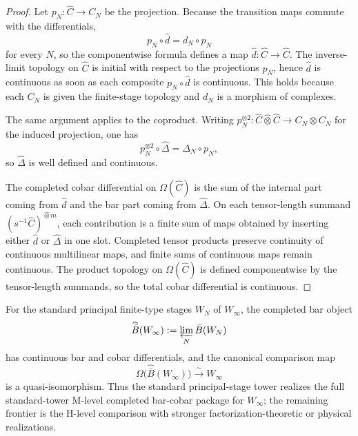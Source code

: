 \begin{proof}
Let $p_N\colon \widehat C \to C_N$ be the projection.  Because the
transition maps commute with the differentials,
\[
p_N \circ \widehat d = d_N \circ p_N
\]
for every $N$, so the componentwise formula defines a map
$\widehat d\colon \widehat C \to \widehat C$.  The inverse-limit
topology on $\widehat C$ is initial with respect to the projections
$p_N$, hence $\widehat d$ is continuous as soon as each composite
$p_N \circ \widehat d$ is continuous.  This holds because each $C_N$ is
given the finite-stage topology and $d_N$ is a morphism of complexes.

The same argument applies to the coproduct.  Writing
$p_N^{\otimes 2}\colon \widehat C \widehat\otimes \widehat C \to
C_N\otimes C_N$ for the induced projection, one has
\[
p_N^{\otimes 2} \circ \widehat\Delta = \Delta_N \circ p_N,
\]
so $\widehat\Delta$ is well defined and continuous.

The completed cobar differential on $\Omega(\widehat C)$ is the sum of
the internal part coming from $\widehat d$ and the bar part coming from
$\widehat\Delta$.  On each tensor-length summand
$(s^{-1}\widehat C)^{\widehat\otimes m}$, each contribution is a finite
sum of maps obtained by inserting either $\widehat d$ or
$\widehat\Delta$ in one slot.  Completed tensor products preserve
continuity of continuous multilinear maps, and finite sums of
continuous maps remain continuous.  The product topology on
$\Omega(\widehat C)$ is defined componentwise by the tensor-length
summands, so the total cobar differential is continuous.
\end{proof}

\begin{corollary}
\label{cor:winfty-standard-mc4-package}
For the standard principal finite-type stages $W_N$ of $W_\infty$, the
completed bar object
\[
\widehat{\bar B}(W_\infty) := \varprojlim_N \bar B(W_N)
\]
has continuous bar and cobar differentials, and the canonical
comparison map
\[
\Omega\bigl(\widehat{\bar B}(W_\infty)\bigr) \xrightarrow{\sim} W_\infty
\]
is a quasi-isomorphism.
Thus the standard principal-stage tower realizes the full
standard-tower M-level completed bar-cobar package for $W_\infty$; the
remaining frontier is
the H-level comparison with stronger factorization-theoretic or
physical realizations.
\end{corollary}


